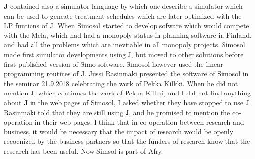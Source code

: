 \textbf{J} contained also a simulator language by which one describe a simulator
which can be used to geneate
treatment schedules which are later optimized with the
LP funtions of J. When Simosol started
to develop sofware which would compete with the Mela, which had had a
monopoly status in planning software
in Finland, and had all the problems which are inevitable in all monopoly projects.
Simosol made first simulator developments using J, but moved to other solutions before first
published version of Simo software. Simosol however used the
linear programming routines
of J. Jussi Rasinmaki presented the software of Simosol
in the seminar 21.9.2018 celebrating the work of Pekka Kilkki.
When he did not mention J, which continues the work of Pekka Kilkki,
and I did not
find anything about \textbf{J} in the web pages of Simosol,
I asked whether they have stopped to use J.
Rasinmäki told that they are still using J, and he promised to mention the
co-operation in their web pages. I think that in co-operation
between research and
business, it would be necessary that the impact of research
would be openly recocnized by the business partners so
that the funders of research know that the research has been useful.
Now Simsol is part of Afry.
